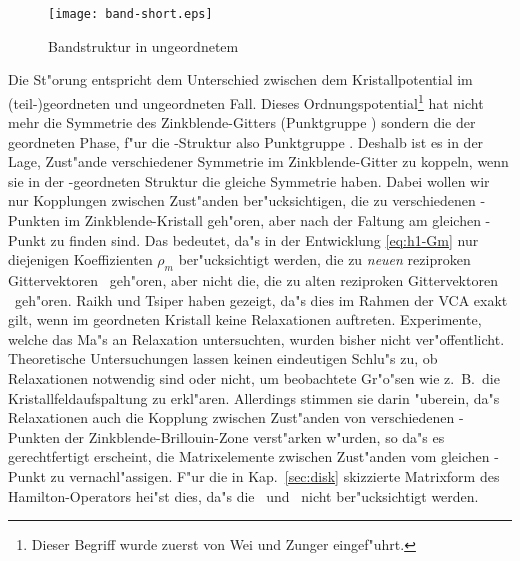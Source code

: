 \begin{figure}[htb]
  \texttt{[image: band-short.eps]}
  \caption{Bandstruktur in ungeordnetem \GaInP}
  \label{fig:band-short}
\end{figure}


Die St"orung  entspricht dem Unterschied zwischen dem
Kristallpotential im (teil-)geordneten und ungeordneten Fall. Dieses
Ordnungspotential\footnote{Dieser Begriff wurde zuerst von Wei und Zunger
  \cite{wezu:89} eingef"uhrt.}  
hat nicht mehr die Symmetrie des Zinkblende-Gitters (Punktgruppe \Td) sondern
die der geordneten Phase, f"ur die \CuPt-Struktur also Punktgruppe \Cdv.
Deshalb ist es in der Lage, Zust"ande verschiedener Symmetrie im
Zinkblende-Gitter zu koppeln, wenn sie in der \CuPt-geordneten Struktur die
gleiche Symmetrie haben. Dabei wollen wir nur Kopplungen zwischen Zust"anden
ber"ucksichtigen, die zu verschiedenen -Punkten im Zinkblende-Kristall
geh"oren, aber nach der Faltung am gleichen -Punkt zu finden sind. Das
bedeutet, da"s in der Entwicklung \eqref{eq:h1-Gm} nur diejenigen
Koeffizienten $\rho_{m}$ ber"ucksichtigt werden, die zu \emph{neuen}
reziproken Gittervektoren \nG\ geh"oren, aber nicht die, die zu alten
reziproken Gittervektoren \aG\ geh"oren. Raikh und Tsiper
\cite{rats:94} haben gezeigt, da"s dies im Rahmen der VCA exakt gilt, wenn im
geordneten Kristall keine Relaxationen auftreten. Experimente, welche das Ma"s
an Relaxation untersuchten, wurden bisher nicht ver"offentlicht.  Theoretische
Untersuchungen \cite{wfz:95,ylcy:97} lassen keinen eindeutigen Schlu"s zu,
ob Relaxationen notwendig sind oder nicht, um beobachtete Gr"o"sen wie z.~B.\ 
die Kristallfeldaufspaltung zu erkl"aren. Allerdings stimmen sie darin
"uberein, da"s Relaxationen auch die Kopplung zwischen Zust"anden von
verschiedenen \vec{k}-Punkten der Zinkblende-Brillouin-Zone verst"arken
w"urden, so da"s es gerechtfertigt erscheint, die Matrixelemente zwischen
Zust"anden vom gleichen \vec{k}-Punkt zu vernachl"assigen. F"ur die in
Kap.~\ref{sec:disk} skizzierte Matrixform des Hamilton-Operators hei"st dies,
da"s die \VnnKKee\ und \VnnKKzz\ nicht ber"ucksichtigt werden.

